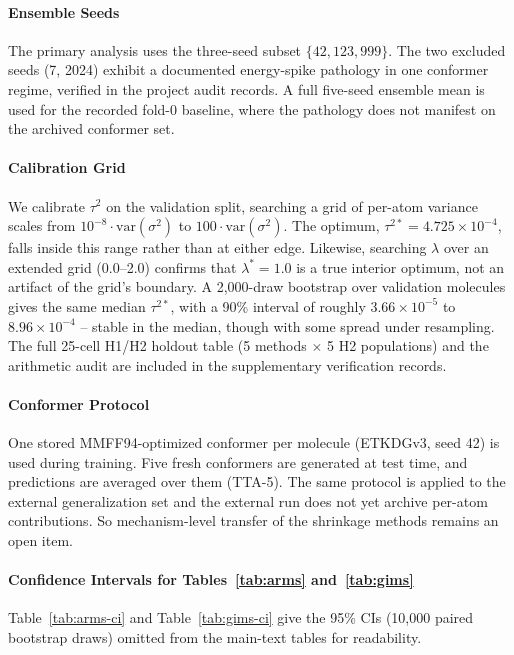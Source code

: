 \documentclass{article}
\begin{document}
\paragraph{Ensemble Seeds} The primary analysis uses the three-seed subset
$\{42, 123, 999\}$. The two excluded seeds (7, 2024) exhibit a documented
energy-spike pathology in one conformer regime, verified in the project
audit records. A full five-seed ensemble mean is used for the recorded
fold-0 baseline, where the pathology does not manifest on the archived
conformer set.

\paragraph{Calibration Grid} We calibrate $\tau^2$ on the validation split,
searching a grid of per-atom variance scales from $10^{-8}\cdot\mathrm{var}(\sigma^2)$
to $100\cdot\mathrm{var}(\sigma^2)$. The optimum, $\tau^{2*} =
4.725\times10^{-4}$, falls inside this range rather than at either edge.
Likewise, searching $\lambda$ over an extended grid (0.0--2.0) confirms that
$\lambda^*=1.0$ is a true interior optimum, not an artifact of the grid's
boundary. A 2{,}000-draw bootstrap over validation molecules gives the same
median $\tau^{2*}$, with a 90\% interval of roughly $3.66\times10^{-5}$ to
$8.96\times10^{-4}$ -- stable in the median, though with some spread under
resampling. The full 25-cell H1/H2 holdout table (5 methods $\times$ 5 H2
populations) and the arithmetic audit are included in the supplementary
verification records.



\paragraph{Conformer Protocol} One stored MMFF94-optimized conformer per
molecule (ETKDGv3, seed 42) is used during training. Five fresh conformers
are generated at test time, and predictions are averaged over them (TTA-5). The
same protocol is applied to the external generalization set and the external run
does not yet archive per-atom contributions. So mechanism-level transfer of
the shrinkage methods remains an open item.

\paragraph{Confidence Intervals for Tables~\ref{tab:arms} and~\ref{tab:gims}}
Table~\ref{tab:arms-ci} and Table~\ref{tab:gims-ci} give the 95\% CIs
(10{,}000 paired bootstrap draws) omitted from the main-text tables for
readability.
\end{document}
